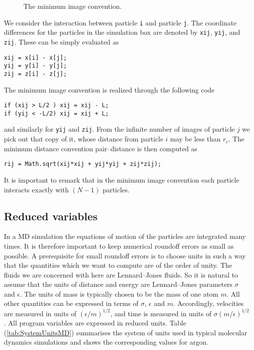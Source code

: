 \begin{figure}[htbp]
  \begin{center}
    
    \caption{The minimum image convention.}
    \label{fig:MinimumImage}
  \end{center}
\end{figure}

We consider the interaction between particle \verb|i| and particle \verb|j|.
The coordinate differences for the particles in the simulation box are denoted
by \verb|xij|, \verb|yij|, and \verb|zij|. These can be simply evaluated as
\begin{verbatim}
xij = x[i] - x[j];
yij = y[i] - y[j];
zij = z[i] - z[j];
\end{verbatim} 
The minimum image convention  is realized
through the following code
\begin{verbatim}
if (xij > L/2 ) xij = xij - L;
if (yij < -L/2) xij = xij + L;
\end{verbatim}
and similarly for \verb|yij| and \verb|zij|. From the infinite number of
images of particle $j$ we pick out that copy of it, whose distance from 
particle $i$ may be  less than $r_c$. The minimum distance convention
pair--distance is then computed as
\begin{verbatim}
rij = Math.sqrt(xij*xij + yij*yij + zij*zij);
\end{verbatim}
It is important to remark that in the minimum image convention each particle
interacts exactly with $(N-1)$ particles.

\subsection{Reduced variables}
In a MD simulation the equations of motion of the particles are integrated
many times. It is therefore important to keep numerical roundoff errors as
small as possible. A prerequisite for small roundoff errors is to choose units
in such a way that the quantities which we want to compute are of the order of
unity. The fluids we are concerned with here are Lennard--Jones fluids. So it
is natural to assume that the  
units of distance and energy are Lennard--Jones parameters $\sigma$ and
$\epsilon$. The units of mass is typically chosen to be the mass of one atom
$m$. All other quantities can be expressed in terms of $\sigma$, $\epsilon$
and $m$. Accordingly, velocities are measured in units of 
$(\epsilon/m)^{1/2}$, and time is measured in units of  
$\sigma(m/\epsilon)^{1/2}$. All program variables are expressed in reduced
units. Table (\ref{tab:SystemUnitsMD}) summarises the 
system of units used in typical
molecular dynamics simulations  and shows the corresponding values for argon.

